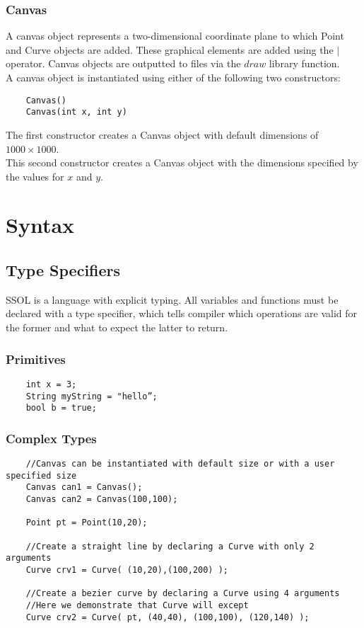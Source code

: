 \documentclass{article}
\begin{document}
\subsubsection{Canvas}
A canvas object represents a two-dimensional coordinate plane to which Point and Curve objects are added. 
These graphical elements are added using the $|$ operator. Canvas objects are outputted to files via the $draw$ library function.\\

\noindent A canvas object is instantiated using either of the following two constructors:
\begin{verbatim}
    Canvas() 
    Canvas(int x, int y) 
\end{verbatim}
The first constructor creates a Canvas object with default dimensions of $1000 \times 1000$.\\
This second constructor creates a Canvas object with the dimensions specified by the values for $x$ and $y$.



\section{Syntax}
\subsection{Type Specifiers}
SSOL is a language with explicit typing. All variables and functions must be declared with a type specifier, which tells compiler which operations are valid for the former and what to expect the latter to return. 
\subsubsection{Primitives}
\begin{verbatim}
    int x = 3;
    String myString = "hello”;
    bool b = true;
\end{verbatim}

\subsubsection{Complex Types}
\begin{verbatim}
    //Canvas can be instantiated with default size or with a user specified size
    Canvas can1 = Canvas();
    Canvas can2 = Canvas(100,100);
    
    Point pt = Point(10,20);
    
    //Create a straight line by declaring a Curve with only 2 arguments
    Curve crv1 = Curve( (10,20),(100,200) );
    
    //Create a bezier curve by declaring a Curve using 4 arguments
    //Here we demonstrate that Curve will except 
    Curve crv2 = Curve( pt, (40,40), (100,100), (120,140) );
\end{verbatim}
\end{document}
